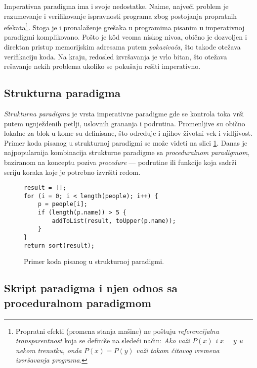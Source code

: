 Imperativna paradigma ima i svoje nedostatke. Naime, najveći problem je razumevanje i verifikovanje ispravnosti programa zbog postojanja propratnih efekata\footnote{Propratni efekti (promena stanja mašine) ne poštuju \emph{referencijalnu transparentnost} koja se definiše na sledeći način: \emph{Ako važi $P(x)$ i $x = y$ u nekom trenutku, onda $P(x) = P(y)$ važi tokom čitavog vremena izvršavanja programa}.}. Stoga je i pronalaženje grešaka u programima pisanim u imperativnoj paradigmi komplikovano. Pošto je k\^od veoma niskog nivoa, obično je dozvoljen i direktan pristup memorijskim adresama putem \emph{pokazivača}, što takođe otežava verifikaciju koda. Na kraju, redosled izvršavanja je vrlo bitan, što otežava rešavanje nekih problema ukoliko se pokušaju rešiti imperativno.


\subsection{Strukturna paradigma}
\label{subsec:ParadigmImperativeStructural}

\emph{Strukturna paradigma} je vrsta imperativne paradigme gde se kontrola toka vrši putem ugnježdenih petlji, uslovnih grananja i podrutina. Promenljive su obično lokalne za blok u kome su definisane, što određuje i njihov životni vek i vidljivost. Primer koda pisanog u strukturnoj paradigmi se može videti na slici \ref{fig:ParadigmStructural}. Danas je najpopularnija kombinacija strukturne paradigme sa \emph{proceduralnom paradigmom}, baziranom na konceptu poziva \emph{procedure} --- podrutine ili funkcije koja sadrži seriju koraka koje je potrebno izvršiti redom.

\begin{figure}[h!]
\begin{lstlisting}
result = [];
for (i = 0; i < length(people); i++) {
    p = people[i];
    if (length(p.name)) > 5 {
        addToList(result, toUpper(p.name));
    }
}
return sort(result);
\end{lstlisting}
\caption{Primer koda pisanog u strukturnoj paradigmi.}
\label{fig:ParadigmStructural}
\end{figure}


\subsection{Skript paradigma i njen odnos sa proceduralnom paradigmom}
\label{subsec:Languages}

